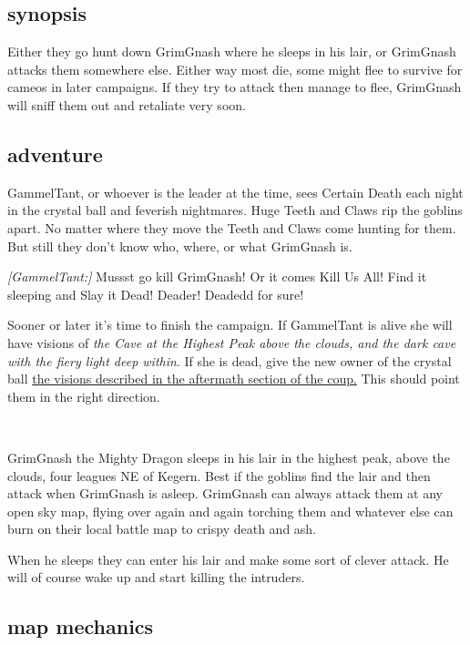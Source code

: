 \subsection*{synopsis}

Either they go hunt down GrimGnash where he sleeps in his lair, or GrimGnash attacks them somewhere else. Either way most die, some might flee to survive for cameos in later campaigns. If they try to attack then manage to flee, GrimGnash will sniff them out and retaliate very soon.


\subsection*{adventure}

GammelTant, or whoever is the leader at the time, sees Certain Death each night in the crystal ball and feverish nightmares. Huge Teeth and Claws rip the goblins apart. No matter where they move the Teeth and Claws come hunting for them. But still they don't know who, where, or what GrimGnash is.

\begin{readoutloud}
\emph{[GammelTant:]} Mussst go kill GrimGnash! Or it comes Kill Us All! Find it sleeping and Slay it Dead! Deader! Deadedd for sure!
\end{readoutloud}

Sooner or later it's time to finish the campaign. If GammelTant is alive she will have visions of \emph{the Cave at the Highest Peak above the clouds, and the dark cave with the fiery light deep within}. If she is dead, give the new owner of the crystal ball \hyperref[coupaftermath]{the visions described in the aftermath section of the coup.} This should point them in the right direction. 

\

\noindent GrimGnash the Mighty Dragon sleeps in his lair in the highest peak, above the clouds, four leagues NE of Kegern. Best if the goblins find the lair and then attack when GrimGnash is asleep. GrimGnash can always attack them at any open sky map, flying over again and again torching them and whatever else can burn on their local battle map to crispy death and ash.

When he sleeps they can enter his lair and make some sort of clever attack. He will of course wake up and start killing the intruders.


\subsection*{map mechanics}

